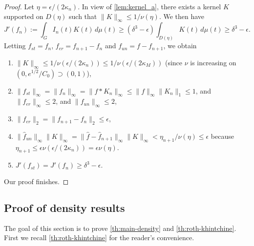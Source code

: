 \begin{proof}
    Let $\eta = \epsilon/(2 \kappa_n)$. In view of \cref{lem:kernel_a}, there exists a kernel $K$ supported on $D(\eta)$ such that $\lVert K \rVert_{\infty} \leq 1/\nu(\eta)$.
    We then have
    \[
        J'(f_{n}) := \int_G I_{n}(t) K(t) \, d \mu(t) \geq (\delta^3 - \epsilon) \int_{D(\eta)} K(t) \, d\mu(t) \geq \delta^3 - \epsilon.
    \]
    Letting $f_{st} = f_n$, $f_{er} = f_{n+1} - f_n$ and $f_{un} = f - f_{n+1}$, we obtain
    \begin{enumerate}
        \item $\lVert K \rVert_{\infty} \leq 1/\nu(\epsilon/(2\kappa_n)) \leq 1/\nu(\epsilon/(2 \kappa_M))$ (since $\nu$ is increasing on $(0, e^{1/2}/C_0) \supset (0, 1)$),

        \item $\lVert f_{st} \rVert_{\infty} = \lVert f_n \rVert_{\infty} = \lVert f * K_n \rVert_{\infty} \leq \lVert f \rVert_{\infty} \lVert K_n \rVert_1 \leq 1$, and $\lVert f_{er} \rVert_{\infty} \leq 2$, and $\lVert f_{un} \rVert_{\infty} \leq 2$,
        
        \item $\lVert f_{er} \rVert_2 = \lVert f_{n+1} - f_n \rVert_2 \leq \epsilon$,
        
        \item $\lVert \hat{f}_{un} \rVert_{\infty} \lVert K \rVert_{\infty} = \lVert \hat{f} - \hat{f}_{n+1} \rVert_{\infty} \lVert K \rVert_{\infty} < \eta_{n+1}/ \nu(\eta) \leq \epsilon$ because $\eta_{n+1} \leq \epsilon \nu(\epsilon/(2\kappa_n)) = \epsilon \nu(\eta).$
        
        \item $J'(f_{st}) = J'(f_n) \geq \delta^3 - \epsilon$.
    \end{enumerate}
    Our proof finishes. 
\end{proof}

\subsection{Proof of density results}
The goal of this section is to prove \cref{th:main-density} and \cref{th:roth-khintchine}. First we recall \cref{th:roth-khintchine} for the reader's convenience.

